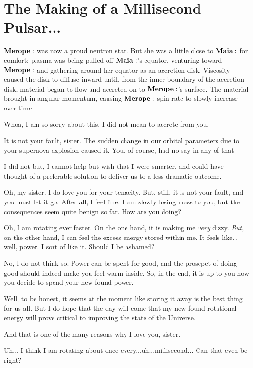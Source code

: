 \section{The Making of a Millisecond Pulsar...}

$\Merope$ was now a proud neutron star.  But she was a little close to $\Maia$ for comfort; plasma was being pulled off $\Maia$'s equator, venturing toward $\Merope$ and gathering around her equator as an accretion disk.  Viscosity caused the disk to diffuse inward until, from the inner boundary of the accretion disk, material began to flow and accreted on to $\Merope$'s surface.  The material brought in angular momentum, causing $\Merope$ spin rate to slowly increase over time.

\Merope Whoa, I am so sorry about this.  I did not mean to accrete from you.

\Maia It is not your fault, sister.  The sudden change in our orbital parameters due to your supernova explosion caused it.  You, of course, had no say in any of that.

\Merope I did not but, I cannot help but wish that I were smarter, and could have thought of a preferable solution to deliver us to a less dramatic outcome.

\Maia Oh, my sister.  I do love you for your tenacity.  But, still, it is not your fault, and you must let it go.  After all, I feel fine.  I am slowly losing mass to you, but the consequences seem quite benign so far.  How are you doing?

\Merope Oh, I am rotating ever faster.  On the one hand, it is making me \textit{very} dizzy.  \textit{But}, on the other hand, I can feel the excess energy stored within me.  It feels like... well, power.  I sort of like it.  Should I be ashamed?

\Maia No, I do not think so.  Power can be spent for good, and the prosepct of doing good should indeed make you feel warm inside.  So, in the end, it is up to you how you decide to spend your new-found power.

\Merope  Well, to be honest, it seems at the moment like storing it away is the best thing for us all.  But I do hope that the day will come that my new-found rotational energy will prove critical to improving the state of the Universe.

\Maia And that is one of the many reasons why I love you, sister.  

\Merope Uh... I think I am rotating about once every...uh...millisecond... Can that even be right?

